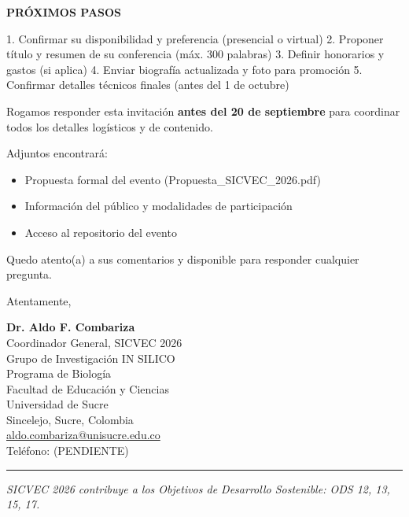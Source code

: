 \documentclass[12pt,a4paper]{article}
\begin{document}
\vspace{0.5cm}

\noindent
\textbf{PRÓXIMOS PASOS}

1. Confirmar su disponibilidad y preferencia (presencial o virtual)
2. Proponer título y resumen de su conferencia (máx. 300 palabras)
3. Definir honorarios y gastos (si aplica)
4. Enviar biografía actualizada y foto para promoción
5. Confirmar detalles técnicos finales (antes del 1 de octubre)

\vspace{0.8cm}

Rogamos responder esta invitación \textbf{antes del 20 de septiembre} para coordinar todos los detalles logísticos y de contenido.

\vspace{0.8cm}

Adjuntos encontrará:
\begin{itemize}
  \item Propuesta formal del evento (Propuesta\_SICVEC\_2026.pdf)
  \item Información del público y modalidades de participación
  \item Acceso al repositorio del evento
\end{itemize}

\vspace{0.8cm}

Quedo atento(a) a sus comentarios y disponible para responder cualquier pregunta.

\vspace{1cm}

Atentamente,

\vspace{1cm}

\textbf{Dr. Aldo F. Combariza}\\
Coordinador General, SICVEC 2026\\
Grupo de Investigación IN SILICO\\
Programa de Biología\\
Facultad de Educación y Ciencias\\
Universidad de Sucre\\
Sincelejo, Sucre, Colombia\\
\href{mailto:aldo.combariza@unisucre.edu.co}{aldo.combariza@unisucre.edu.co}\\
Teléfono: (PENDIENTE)

\vspace{0.8cm}

\noindent
\rule{\textwidth}{0.5pt}

\vspace{0.5cm}

\noindent
\textit{\small SICVEC 2026 contribuye a los Objetivos de Desarrollo Sostenible: ODS 12, 13, 15, 17.}
\end{document}
